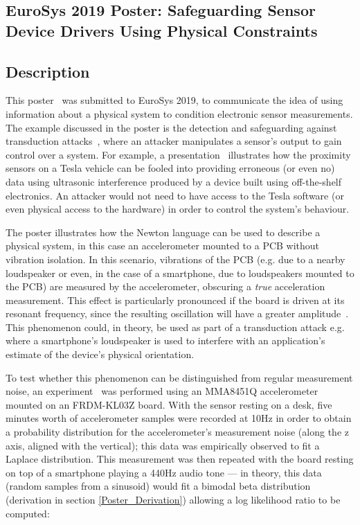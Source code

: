 \documentclass[12pt]{article}
\begin{document}
\begin{appendix}
    \newpage


  \section{EuroSys 2019 Poster: Safeguarding Sensor Device Drivers Using Physical Constraints}
    \subsection{Description}
      This poster~\cite{eurosys_poster} was submitted to EuroSys 2019, to communicate the idea of using information about a physical system to condition electronic sensor measurements. The example discussed in the poster is the detection and safeguarding against transduction attacks~\cite{Fu_2018}, where an attacker manipulates a sensor's output to gain control over a system. For example, a presentation~\cite{autonomous_vehicles} illustrates how the proximity sensors on a Tesla vehicle can be fooled into providing erroneous (or even no) data using ultrasonic interference produced by a device built using off-the-shelf electronics. An attacker would not need to have access to the Tesla software (or even physical access to the hardware) in order to control the system's behaviour.

      The poster illustrates how the Newton language can be used to describe a physical system, in this case an accelerometer mounted to a PCB without vibration isolation. In this scenario, vibrations of the PCB (e.g. due to a nearby loudspeaker or even, in the case of a smartphone, due to loudspeakers mounted to the PCB) are measured by the accelerometer, obscuring a \textit{true} acceleration measurement. This effect is particularly pronounced if the board is driven at its resonant frequency, since the resulting oscillation will have a greater amplitude~\cite{adi}. This phenomenon could, in theory, be used as part of a transduction attack e.g. where a smartphone's loudspeaker is used to interfere with an application's estimate of the device's physical orientation.

      To test whether this phenomenon can be distinguished from regular measurement noise, an experiment~\cite{poster_experiment} was performed using an MMA8451Q accelerometer mounted on an FRDM-KL03Z board. With the sensor resting on a desk, five minutes worth of accelerometer samples were recorded at 10Hz in order to obtain a probability distribution for the accelerometer's measurement noise (along the z axis, aligned with the vertical); this data was empirically observed to fit a Laplace distribution. This measurement was then repeated with the board resting on top of a smartphone playing a 440Hz audio tone --- in theory, this data (random samples from a sinusoid) would fit a bimodal beta distribution (derivation in section \ref{Poster_Derivation}) allowing a log likelihood ratio to be computed:


\end{appendix}
\end{document}
